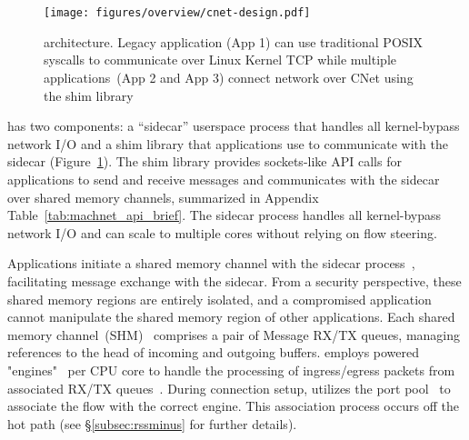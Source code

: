 \section{\mt{}}
\label{sec:overview}
\begin{figure}[t!]
    \centering
    \texttt{[image: figures/overview/cnet-design.pdf]}
    \caption{\mt{} architecture. Legacy application (App 1) can use traditional POSIX syscalls to communicate over Linux Kernel TCP while
    multiple applications~(App 2 and App 3) connect network over CNet using the shim library}
    \label{fig:machnet-overview}
    \vspace{-0.1in}
\end{figure}

\mt{} has two components: a ``sidecar'' userspace process that handles all kernel-bypass network I/O and a shim library that applications use to communicate with the sidecar (Figure~\ref{fig:machnet-overview}).
The shim library provides sockets-like API calls for applications to send and receive messages and communicates with the sidecar over shared memory channels, summarized in Appendix Table~\ref{tab:machnet_api_brief}.
The \mt{} sidecar process handles all kernel-bypass network I/O and can scale to multiple cores without relying on flow steering.

Applications initiate a shared memory channel with the sidecar process~, facilitating message exchange with the \mt{} sidecar.
From a security perspective, these shared memory regions are entirely isolated, and a compromised application cannot manipulate the shared memory region of other applications. 
Each shared memory channel~(SHM)~ comprises a pair of Message RX/TX queues, managing references to the head of incoming and outgoing buffers.
\mt{} employs \rssminus{} powered "engines"~ per CPU core to handle the processing of ingress/egress packets from associated RX/TX queues~.
During connection setup, \mt{} utilizes the \rssminus{} port pool~ to associate the flow with the correct engine.
This association process occurs off the hot path (see \S\ref{subsec:rssminus} for further details).


